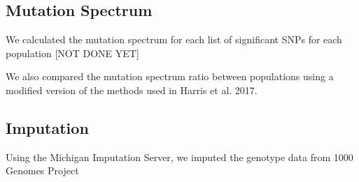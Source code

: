 \documentclass[12pt]{amsart}
\begin{document}
\subsection{Mutation Spectrum}
We calculated the mutation spectrum for each list of significant SNPs for each population [NOT DONE YET]

We also compared the mutation spectrum ratio between populations using a modified version of the methods used in Harris et al. 2017. 

\subsection{Imputation}
Using the Michigan Imputation Server, we imputed the genotype data from 1000 Genomes Project




  
\end{document}
